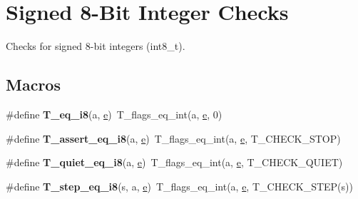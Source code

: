 \hypertarget{group__RTEMSTestFrameworkChecksInt8}{}\section{Signed 8-\/Bit Integer Checks}
\label{group__RTEMSTestFrameworkChecksInt8}


Checks for signed 8-\/bit integers (int8\+\_\+t).  


\subsection*{Macros}
\begin{DoxyCompactItemize}
\item 
\mbox{\label{group__RTEMSTestFrameworkChecksInt8_ga324ab1b9f1f3860aa16110cb9aaa1ce9}} 
\#define {\bfseries T\+\_\+eq\+\_\+i8}(a,  \mbox{\hyperlink{sun4u_2tte_8h_a8b0b9ed08e0e18920ec2682f48228c27}{e}})~T\+\_\+flags\+\_\+eq\+\_\+int(a, \mbox{\hyperlink{sun4u_2tte_8h_a8b0b9ed08e0e18920ec2682f48228c27}{e}}, 0)
\item 
\mbox{\label{group__RTEMSTestFrameworkChecksInt8_ga458bff8ec543cbd00116627cd31b7ce1}} 
\#define {\bfseries T\+\_\+assert\+\_\+eq\+\_\+i8}(a,  \mbox{\hyperlink{sun4u_2tte_8h_a8b0b9ed08e0e18920ec2682f48228c27}{e}})~T\+\_\+flags\+\_\+eq\+\_\+int(a, \mbox{\hyperlink{sun4u_2tte_8h_a8b0b9ed08e0e18920ec2682f48228c27}{e}}, T\+\_\+\+C\+H\+E\+C\+K\+\_\+\+S\+T\+OP)
\item 
\mbox{\label{group__RTEMSTestFrameworkChecksInt8_ga2a0c0c6c66419509ac892d4c069ebe00}} 
\#define {\bfseries T\+\_\+quiet\+\_\+eq\+\_\+i8}(a,  \mbox{\hyperlink{sun4u_2tte_8h_a8b0b9ed08e0e18920ec2682f48228c27}{e}})~T\+\_\+flags\+\_\+eq\+\_\+int(a, \mbox{\hyperlink{sun4u_2tte_8h_a8b0b9ed08e0e18920ec2682f48228c27}{e}}, T\+\_\+\+C\+H\+E\+C\+K\+\_\+\+Q\+U\+I\+ET)
\item 
\mbox{\label{group__RTEMSTestFrameworkChecksInt8_ga6bd29fed0d13012edc395828dbe1a0f7}} 
\#define {\bfseries T\+\_\+step\+\_\+eq\+\_\+i8}(s,  a,  \mbox{\hyperlink{sun4u_2tte_8h_a8b0b9ed08e0e18920ec2682f48228c27}{e}})~T\+\_\+flags\+\_\+eq\+\_\+int(a, \mbox{\hyperlink{sun4u_2tte_8h_a8b0b9ed08e0e18920ec2682f48228c27}{e}}, T\+\_\+\+C\+H\+E\+C\+K\+\_\+\+S\+T\+EP(s))

\end{DoxyCompactItemize}
